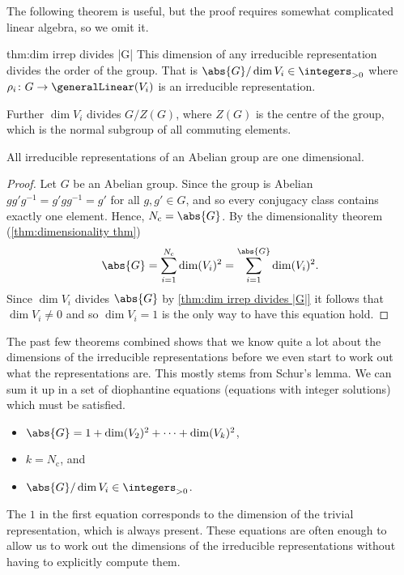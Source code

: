 The following theorem is useful, but the proof requires somewhat complicated
linear algebra, so we omit it.
\begin{thm}{}{thm:dim irrep divides |G|}
    This dimension of any irreducible representation divides the order of
    the group.
    That is \(\abs{G} / \dim V_i \in \positiveintegers\) where \(\rho_i
    \colon G \to \generalLinear(V_i)\) is an irreducible representation.
    
    Further \(\dim V_i\) divides \(G / Z(G)\), where \(Z(G)\) is the centre
    of the group, which is the normal subgroup of all commuting elements.
\end{thm}

\begin{crl}{}{}
    All irreducible representations of an Abelian group are one dimensional.
    
    \begin{proof}
        Let \(G\) be an Abelian group.
        Since the group is Abelian \(gg'g^{-1} = g'gg^{-1} = g'\) for all
        \(g, g' \in G\), and so every conjugacy class contains exactly one element.
        Hence, \(N_{\mathrm{c}} = \abs{G}\).
        By the dimensionality theorem (\cref{thm:dimensionality thm})
        \begin{equation}
            \abs{G} = \sum_{i = 1}^{N_{\mathrm{c}}} \dim(V_i)^2 = \sum_{i =
                1}^{\abs{G}} \dim(V_i)^2.
        \end{equation}
        Since \(\dim V_i\) divides \(\abs{G}\) by \cref{thm:dim irrep
            divides |G|} it follows that \(\dim V_i \ne 0\) and so \(\dim V_i = 1\) is the
        only way to have this equation hold.
    \end{proof}
\end{crl}

The past few theorems combined shows that we know quite a lot about the
dimensions of the irreducible representations before we even start to work out
what the representations are.
This mostly stems from Schur's lemma.
We can sum it up in a set of diophantine equations (equations with integer
solutions) which must be satisfied.
\begin{important}
    \begin{itemize}
        \item \(\abs{G} = 1 + \dim(V_2)^2 + \dotsb + \dim(V_k)^2\),
        \item \(k = N_{\mathrm{c}}\), and
        \item \(\abs{G} / \dim V_i \in \positiveintegers\).
    \end{itemize}
\end{important}
The \(1\) in the first equation corresponds to the dimension of the trivial
representation, which is always present.
These equations are often enough to allow us to work out the dimensions of
the irreducible representations without having to explicitly compute them.


